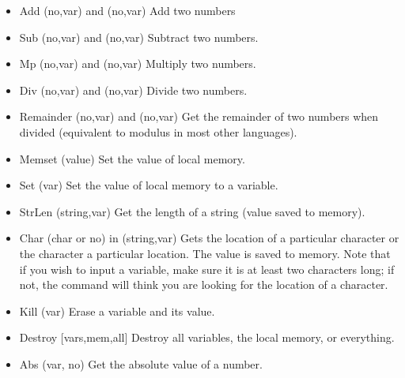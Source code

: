 \documentclass{report}
\begin{document}
\begin{itemize}
\item{Add (no,var) and (no,var)}\newline
Add two numbers

\item{Sub (no,var) and (no,var)}\newline
Subtract two numbers.

\item{Mp (no,var) and (no,var)}\newline
Multiply two numbers.

\item{Div (no,var) and (no,var)}\newline
Divide two numbers.

\item{Remainder (no,var) and (no,var)}\newline
Get the remainder of two numbers when divided (equivalent to modulus in most other languages).

\item{Memset (value)}\newline
Set the value of local memory.

\item{Set (var)}\newline
Set the value of local memory to a variable.

\item{StrLen (string,var)}\newline
Get the length of a string (value saved to memory).

\item{Char (char or no) in (string,var)}\newline
Gets the location of a particular character or the character a particular location. The value is saved to memory. Note that if you wish to input a variable, make sure it is at least two characters long; if not, the command will think you are looking for the location of a character.

\item{Kill (var)}\newline
Erase a variable and its value.

\item{Destroy [vars,mem,all]}\newline
Destroy all variables, the local memory, or everything.

\item{Abs (var, no)}\newline
Get the absolute value of a number.


\end{itemize}
\end{document}
